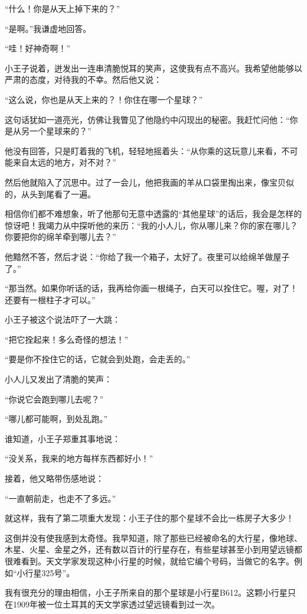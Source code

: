 “什么！你是从天上掉下来的？”

“是啊。”我谦虚地回答。

“哇！好神奇啊！”

小王子说着，迸发出一连串清脆悦耳的笑声，这使我有点不高兴。我希望他能够以严肃的态度，对待我的不幸。然后他又说：

“这么说，你也是从天上来的？！你住在哪一个星球？”

这句话犹如一道亮光，仿佛让我瞥见了他隐约中闪现出的秘密。我赶忙问他：“你是从另一个星球来的？”

他没有回答，只是盯着我的飞机，轻轻地摇着头：“从你乘的这玩意儿来看，不可能来自太远的地方，对不对？”

然后他就陷入了沉思中。过了一会儿，他把我画的羊从口袋里掏出来，像宝贝似的，从头到尾看了一遍。

相信你们都不难想象，听了他那句无意中透露的“其他星球”的话后，我会是怎样的惊讶吧！我竭力从中探听他的来历：“我的小人儿，你从哪儿来？你的家在哪儿？你要把你的绵羊牵到哪儿去？”

他黯然不答，然后才说：“你给了我一个箱子，太好了。夜里可以给绵羊做屋子了。”

“那当然。如果你听话的话，我再给你画一根绳子，白天可以拴住它。喔，对了！还要有一根柱子才可以。”

小王子被这个说法吓了一大跳：

“把它拴起来！多么奇怪的想法！”

“要是你不拴住它的话，它就会到处跑，会走丢的。”

小人儿又发出了清脆的笑声：

“你说它会跑到哪儿去呢？”

“哪儿都可能啊，到处乱跑。”

谁知道，小王子郑重其事地说：

“没关系，我来的地方每样东西都好小！”

接着，他又略带伤感地说：

“一直朝前走，也走不了多远。”


\stoptitle

\starttitle[title={4}]

就这样，我有了第二项重大发现：小王子住的那个星球不会比一栋房子大多少！

这倒并没有使我感到太奇怪。我早知道，除了那些已经被命名的大行星，像地球、木星、火星、金星之外，还有数以百计的行星存在，有些星球甚至小到用望远镜都很难看到。天文学家发现这种小行星的时候，就给它编个号码，当做它的名字。例如“小行星325号”。

我有很充分的理由相信，小王子所来自的那个星球是小行星B612。这颗小行星只在1909年被一位土耳其的天文学家透过望远镜看到过一次。

